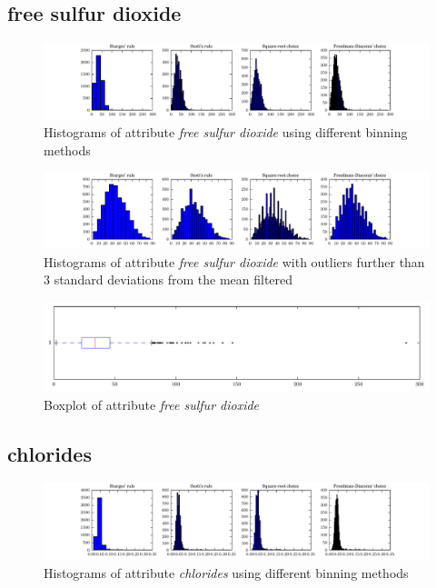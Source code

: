 \documentclass{report}
\begin{document}
\newpage\subsection{free sulfur dioxide}
\begin{figure}[H]
\includegraphics[width=\textwidth]{histograms/free_sulfur_dioxide.pdf}
\caption{Histograms of attribute \emph{free sulfur dioxide} using different binning methods}\end{figure}

\begin{figure}[H]
\includegraphics[width=\textwidth]{histograms/free_sulfur_dioxide_filtered.pdf}
\caption{Histograms of attribute \emph{free sulfur dioxide} with outliers further than 3 standard deviations from the mean filtered}
\end{figure}

\begin{figure}[H]
\includegraphics[width=\textwidth]{boxplots/free_sulfur_dioxide.pdf}
\caption{Boxplot of attribute \emph{free sulfur dioxide}}\end{figure}

\newpage\subsection{chlorides}
\begin{figure}[H]
\includegraphics[width=\textwidth]{histograms/chlorides.pdf}
\caption{Histograms of attribute \emph{chlorides} using different binning methods}\end{figure}
\end{document}
